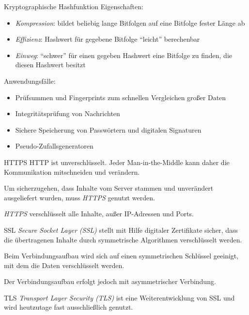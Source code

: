 \begin{bonus}{Kryptographische Hashfunktion}
    Eigenschaften:
    \begin{itemize}
        \item \emph{Kompression}: bildet beliebig lange Bitfolgen auf eine Bitfolge fester Länge ab
        \item \emph{Effizienz}: Hashwert für gegebene Bitfolge \enquote{leicht} berechenbar
        \item \emph{Einweg}: \enquote{schwer} für einen gegeben Hashwert eine Bitfolge zu finden, die diesen Hashwert besitzt
    \end{itemize}

    Anwendungsfälle:
    \begin{itemize}
        \item Prüfsummen und Fingerprints zum schnellen Vergleichen großer Daten
        \item Integritätsprüfung von Nachrichten
        \item Sichere Speicherung von Passwörtern und digitalen Signaturen
        \item Pseudo-Zufallsgeneratoren
    \end{itemize}
\end{bonus}

\begin{defi}{HTTPS}
    HTTP ist unverschlüsselt.
    Jeder Man-in-the-Middle kann daher die Kommunikation mitschneiden und verändern.

    Um sicherzugehen, dass Inhalte vom Server stammen und unverändert ausgeliefert wurden, muss \emph{HTTPS} genutzt werden.

    \emph{HTTPS} verschlüsselt alle Inhalte, außer IP-Adressen und Ports.
\end{defi}

\begin{bonus}{SSL}
    \emph{Secure Socket Layer (SSL)} stellt mit Hilfe digitaler Zertifikate sicher, dass die übertragenen Inhalte durch symmetrische Algorithmen verschlüsselt werden.

    Beim Verbindungsaufbau wird sich auf einen symmetrischen Schlüssel geeinigt, mit dem die Daten verschlüsselt werden.

    Der Verbindungsaufbau erfolgt jedoch mit asymmetrischer Verbindung.
\end{bonus}

\begin{bonus}{TLS}
    \emph{Transport Layer Security (TLS)} ist eine Weiterentwicklung von SSL und wird heutzutage fast ausschließlich genutzt.
\end{bonus}


